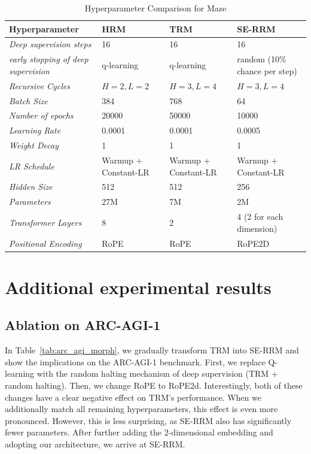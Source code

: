 \documentclass{article}
\theoremstyle{plain}
\theoremstyle{definition}
\theoremstyle{remark}
\begin{document}
\begin{table}[H]
\centering
\caption{Hyperparameter Comparison for Maze}
\label{tab:hyperparams_maze}
\begin{tabular}{@{}llll@{}}
\toprule
\textbf{Hyperparameter} & \textbf{HRM} & \textbf{TRM}  & \textbf{SE-RRM}\\ 

\midrule
\textit{Deep supervision steps} & 16 & 16  & 16 \\
\textit{early stopping of deep supervision} & q-learning & q-learning  & random (10\% chance per step) \\
\textit{Recursive Cycles} & $H=2, L=2$ & $H=3, L=4$  & $H=3, L=4$  \\
\textit{Batch Size} & 384 & 768  & 64 \\
\textit{Number of epochs} & 20000 & 50000  & 10000 \\
\textit{Learning Rate} & 0.0001 & 0.0001  & 0.0005 \\
\textit{Weight Decay} & 1 & 1 & 1 \\
\textit{LR Schedule} & Warmup + Constant-LR & Warmup + Constant-LR & Warmup + Constant-LR \\
\textit{Hidden Size} & 512 & 512 & 256 \\
\textit{Parameters} & 27M & 7M & 2M \\
\textit{Transformer Layers} & 8 & 2 & 4 (2 for each dimension) \\ 
\textit{Positional Encoding} & RoPE &RoPE & RoPE2D \\ 
\bottomrule
\end{tabular}
\end{table}


\section{Additional experimental results}

\subsection{Ablation on ARC-AGI-1}

In Table~\ref{tab:arc_agi_morph}, we gradually transform TRM into SE-RRM and show the implications on the ARC-AGI-1 benchmark. First, we replace Q-learning with the random halting mechanism of deep supervision (TRM + random halting). Then, we change RoPE to RoPE2d. Interestingly, both of these changes have a clear negative effect on TRM's performance. When we additionally match all remaining hyperparameters, this effect is even more pronounced. However, this is less surprising, as SE-RRM also has significantly fewer parameters. After further adding the 2-dimensional embedding and adopting our architecture, we arrive at SE-RRM.
\end{document}
